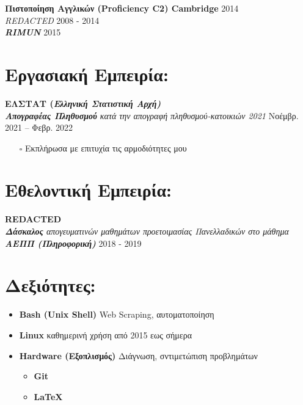 \documentclass[letterpaper, 11pt]{article}
\newcommand{\secStartSpace}{\vspace{3pt}}
\newcommand{\secEndSpace}{\vspace{5pt}}
\begin{document}
\begin{addmargin}[1em]{1em}
	\textbf{Πιστοποίηση Αγγλικών (Proficiency C2) Cambridge} \hfill 2014\\
	\setlength\parindent{1cm} \textit{REDACTED} \hfill 2008 - 2014\\
	\setlength\parindent{1cm} \textit\textbf{RIMUN} \hfill 2015
\end{addmargin}
\secEndSpace


\section{\color{red} \textbf{Εργασιακή Εμπειρία:}}
\secStartSpace
\begin{addmargin}[1em]{1em}
	\textbf{ΕΛΣΤΑΤ (\textit{Ελληνική Στατιστική Αρχή)}}\\
	\setlength\parindent{1cm} \textit{\textbf{Απογραφέας Πληθυσμού} \small{κατά την απογραφή πληθυσμού-κατοικιών 2021}} \hfill Νοέμβρ. 2021 – Φεβρ. 2022
	\begin{itemize}
		\item[$\square$] \small{Εκπλήρωσα με επιτυχία τις αρμοδιότητες μου}
	\end{itemize}
\end{addmargin}
\secEndSpace

\section{\color{red} \textbf{Εθελοντική Εμπειρία:}}
\secStartSpace
\begin{addmargin}[1em]{1em}
	\textbf{REDACTED}\\
	\setlength\parindent{1cm} \textit{\textbf{Δάσκαλος} \footnotesize{απογευματινών μαθημάτων προετοιμασίας Πανελλαδικών στο μάθημα} \textbf{ΑΕΠΠ (Πληροφορική)}} \hfill 2018 - 2019
\end{addmargin}
\secEndSpace


\section{\color{red} \textbf{Δεξιότητες:}}
\secStartSpace
\begin{addmargin}[1em]{1em}
	\begin{itemize}
		\item \textbf{Bash (Unix Shell)} \small{Web Scraping, αυτοματοποίηση}
		\item \textbf{Linux} \footnotesize{καθημερινή χρήση από 2015 εως σήμερα}
		\item \textbf{Hardware (Εξοπλισμός)} \small{Διάγνωση, σντιμετώπιση προβλημάτων}
		\begin{itemize}
			\item \textbf{Git}
			\item \textbf{{\LaTeX}}
		\end{itemize}
	\end{itemize}
\end{addmargin}
\secEndSpace
\end{document}
